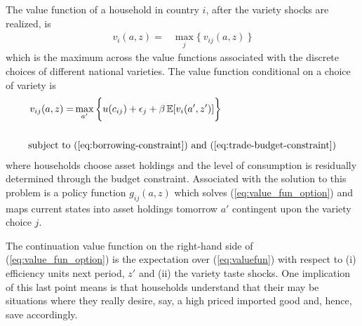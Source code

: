\documentclass[12pt,pdftex]{article}
\begin{document}
\begin{onehalfspacing}
The value function of a household in country $i$, after the variety shocks are realized, is
\begin{align}
v_{i}(a, z) = &  \max_{j} \big  \{ \  v_{ij}(a, z)  \ \big \}
\label{eq:valuefun}
\end{align}
which is the maximum across the value functions associated with the discrete choices of different national varieties. The value function conditional on a choice of variety is
\begin{align}
v_{ij}(a, z) = &  \max_{\ a' \ }\bigg  \{ u(c_{ij}) + \epsilon_{j}  + \beta \, \mathbb{E} [v_{i}(a', z')]  \bigg\}
\label{eq:value_fun_option} \\
\nonumber \\
\mbox{subject to}  \ & (\ref{eq:borrowing-constraint}) \  \mathrm{and} \ (\ref{eq:trade-budget-constraint}) \nonumber
\end{align}
where households choose asset holdings and the level of consumption is residually determined through the budget constraint. Associated with the solution to this problem is a policy function $g_{ij}(a,z)$ which solves (\ref{eq:value_fun_option}) and maps current states into asset holdings tomorrow $a'$ contingent upon the variety choice $j$.

The continuation value function on the right-hand side of (\ref{eq:value_fun_option}) is the expectation over (\ref{eq:valuefun}) with respect to (i) efficiency units next period, $z'$ and (ii) the variety taste shocks. One implication of this last point means is that households understand that their may be situations where they really desire, say, a high priced imported good and, hence, save accordingly.


\end{onehalfspacing}
\end{document}
